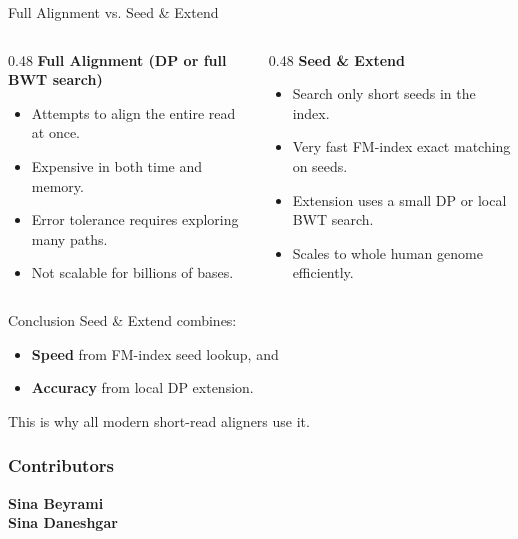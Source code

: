 \documentclass[
11pt, %
aspectratio=169, %
]{beamer}
\begin{document}


\begin{frame}{Full Alignment vs. Seed \& Extend}
    \begin{columns}
        \begin{column}{0.48\textwidth}
            \textbf{Full Alignment (DP or full BWT search)}
            \begin{itemize}
                \item Attempts to align the entire read at once.
                \item Expensive in both time and memory.
                \item Error tolerance requires exploring many paths.
                \item Not scalable for billions of bases.
            \end{itemize}
        \end{column}

        \begin{column}{0.48\textwidth}
            \textbf{Seed \& Extend}
            \begin{itemize}
                \item Search only short seeds in the index.
                \item Very fast FM-index exact matching on seeds.
                \item Extension uses a small DP or local BWT search.
                \item Scales to whole human genome efficiently.
            \end{itemize}
        \end{column}
    \end{columns}

    \begin{block}{Conclusion}
        Seed \& Extend combines:
        \begin{itemize}
            \item \textbf{Speed} from FM-index seed lookup, and
            \item \textbf{Accuracy} from local DP extension.
        \end{itemize}
        This is why all modern short-read aligners use it.
    \end{block}
\end{frame}


\begin{frame}
	\frametitle{Contributors}
	
	\begin{center}
		\textbf{Sina Beyrami}\\[4pt]
		\textbf{Sina Daneshgar}
	\end{center}
	
\end{frame}
\end{document}
